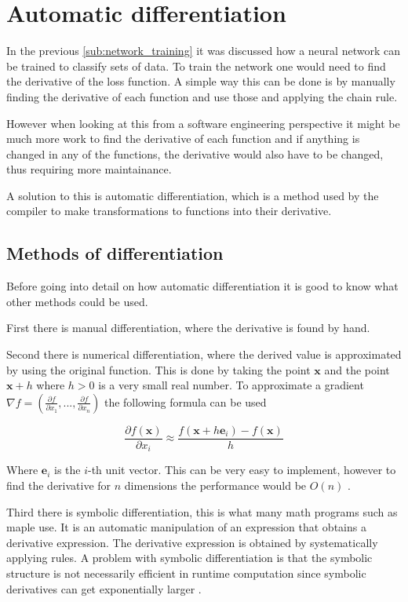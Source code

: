 \section{Automatic differentiation}%
\label{sec:autodiff}

In the previous \autoref{sub:network_training} it was discussed how a neural network can be trained to classify sets of data. To train the network one would need to find the derivative of the loss function. A simple way this can be done is by manually finding the derivative of each function and use those and applying the chain rule.

However when looking at this from a software engineering perspective it might be much more work to find the derivative of each function and if anything is changed in any of the functions, the derivative would also have to be changed, thus requiring more maintainance.

A solution to this is automatic differentiation, which is a method used by the compiler to make transformations to functions into their derivative.

\subsection{Methods of differentiation}

Before going into detail on how automatic differentiation it is good to know what other methods could be used.

First there is manual differentiation, where the derivative is found by hand.

Second there is numerical differentiation, where the derived value is approximated by using the original function. This is done by taking the point $\bm{x}$ and the point $\bm{x}+h$ where $h>0$ is a very small real number. To approximate a gradient $\nabla f = \left(\frac{\partial f}{\partial x_1}, ..., \frac{\partial f}{\partial x_n} \right)$ the following formula can be used

$$\frac{\partial f(\bm{x})}{\partial x_i} \approx \frac{f(\bm{x} + h\bm{e}_i) - f(\bm{x})}{h}$$

Where $\bm{e}_i$ is the $i$-th unit vector. This can be very easy to implement, however to find the derivative for $n$ dimensions the performance would be $O(n)$ \cite{autodiff}.

Third there is symbolic differentiation, this is what many math programs such as maple use. It is an automatic manipulation of an expression that obtains a derivative expression. The derivative expression is obtained by systematically applying rules.
A problem with symbolic differentiation is that the symbolic structure is not necessarily efficient in runtime computation since symbolic derivatives can get exponentially larger
\cite{autodiff}.

